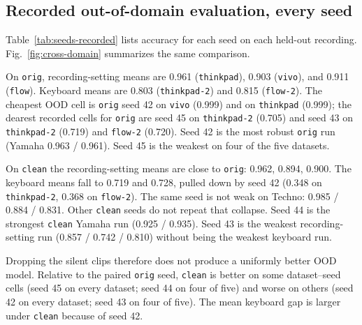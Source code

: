 \documentclass[pdflatex,sn-mathphys-num,iicol]{sn-jnl}
\theoremstyle{thmstyleone}
\theoremstyle{thmstyletwo}
\theoremstyle{thmstylethree}
\begin{document}
\subsection{Recorded out-of-domain evaluation, every seed}\label{subsec4_3}

Table~\ref{tab:seeds-recorded} lists accuracy for each seed on each held-out recording. Fig.~\ref{fig:cross-domain} summarizes the same comparison.

On \texttt{orig}, recording-setting means are 0.961 (\texttt{thinkpad}), 0.903 (\texttt{vivo}), and 0.911 (\texttt{flow}). Keyboard means are 0.803 (\texttt{thinkpad-2}) and 0.815 (\texttt{flow-2}). The cheapest OOD cell is \texttt{orig} seed 42 on \texttt{vivo} (0.999) and on \texttt{thinkpad} (0.999); the dearest recorded cells for \texttt{orig} are seed 45 on \texttt{thinkpad-2} (0.705) and seed 43 on \texttt{thinkpad-2} (0.719) and \texttt{flow-2} (0.720). Seed 42 is the most robust \texttt{orig} run (Yamaha 0.963 / 0.961). Seed 45 is the weakest on four of the five datasets.

On \texttt{clean} the recording-setting means are close to \texttt{orig}: 0.962, 0.894, 0.900. The keyboard means fall to 0.719 and 0.728, pulled down by seed 42 (0.348 on \texttt{thinkpad-2}, 0.368 on \texttt{flow-2}). The same seed is not weak on Techno: 0.985 / 0.884 / 0.831. Other \texttt{clean} seeds do not repeat that collapse. Seed 44 is the strongest \texttt{clean} Yamaha run (0.925 / 0.935). Seed 43 is the weakest recording-setting run (0.857 / 0.742 / 0.810) without being the weakest keyboard run.

Dropping the silent clips therefore does not produce a uniformly better OOD model. Relative to the paired \texttt{orig} seed, \texttt{clean} is better on some dataset--seed cells (seed 45 on every dataset; seed 44 on four of five) and worse on others (seed 42 on every dataset; seed 43 on four of five). The mean keyboard gap is larger under \texttt{clean} because of seed 42.
\end{document}
